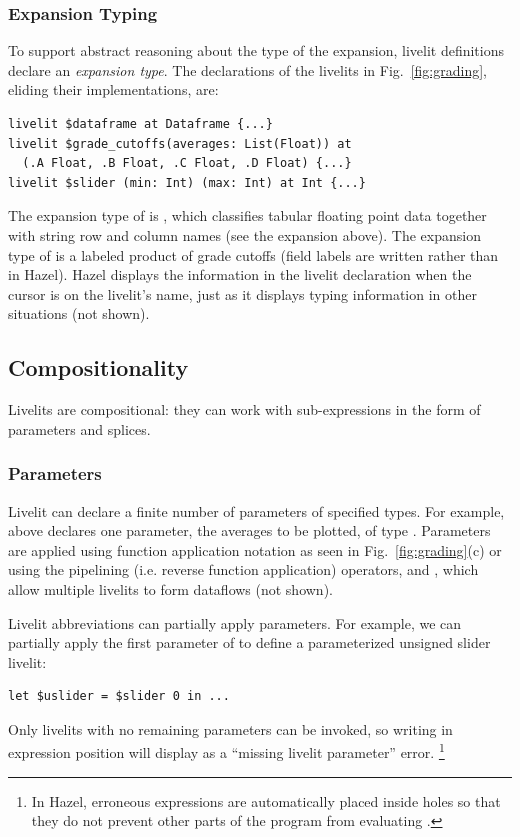 \subsubsection{Expansion Typing} 
\label{sec:expansion-typing}
To support abstract reasoning about the type of the expansion,
livelit definitions declare an \emph{expansion type}.
The declarations of the livelits in Fig.~\ref{fig:grading},
eliding their implementations, are:
\begin{lstlisting}[numbers=none,xleftmargin=0cm]
livelit $dataframe at Dataframe {...}
livelit $grade_cutoffs(averages: List(Float)) at 
  (.A Float, .B Float, .C Float, .D Float) {...}
livelit $slider (min: Int) (max: Int) at Int {...}
\end{lstlisting}
The expansion type of  is ,
which classifies tabular floating point data together with string row and column names (see the expansion above).
The expansion type of  is a labeled product of grade cutoffs (field labels are written 
rather than  in Hazel).
Hazel displays the information in the livelit declaration when the cursor is on the livelit's name,
just as it displays typing information in other situations (not shown).

\subsection{Compositionality}\label{sec:splicing-and-parameterization}
Livelits are compositional: they can work with sub-expressions  
in the form of parameters and splices.

\subsubsection{Parameters}\label{sec:parameterization} 
Livelit can declare a finite number of parameters of specified types. 
For example,  above declares one parameter,
the averages to be plotted, of type .
Parameters are applied  
using function application notation 
as seen in Fig.~\ref{fig:grading}(c) or 
using the pipelining (i.e. reverse function application) operators, \li{<|} and \li{|>}, 
which allow multiple livelits to form dataflows (not shown).

Livelit abbreviations can partially apply parameters. For example, 
we can partially apply the first parameter of  to define a parameterized unsigned slider livelit:
\begin{lstlisting}[numbers=none,xleftmargin=0cm]
let $uslider = $slider 0 in ...
\end{lstlisting}
Only livelits with no remaining parameters can be invoked, 
so writing  in expression position will display as a ``missing livelit parameter'' error.%
\footnote{\label{footnote:typing}In Hazel, erroneous expressions 
are automatically placed inside holes so that they do not prevent other parts of the program from evaluating
\cite{HazelnutLive}.}


